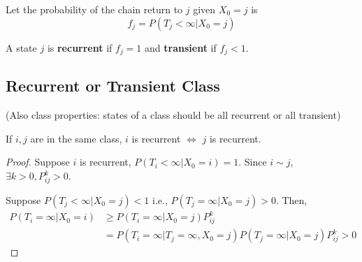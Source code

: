 \documentclass[11pt]{elegantbook}
\begin{document}
Let the probability of the chain return to $j$ given $X_0=j$ is $$f_j=P(T_j<\infty|X_0=j)$$

\begin{definition}
    A state $j$ is \textbf{recurrent} if $f_j=1$ and \textbf{transient} if $f_j<1$.
\end{definition}

\subsection{Recurrent or Transient Class}
(Also class properties: states of a class should be all recurrent or all transient)
\begin{lemma}
    If $i,j$ are in the same class, $i$ is recurrent $\Leftrightarrow$ $j$ is recurrent.
\end{lemma}
\begin{proof}
    Suppose $i$ is recurrent, $P(T_i<\infty|X_0=i)=1$. Since $i\sim j$, $\exists k>0,P_{ij}^k>0$.

    Suppose $P(T_j<\infty|X_0=j)<1$ i.e., $P(T_j=\infty|X_0=j)>0$. Then,
    \begin{equation}
        \begin{aligned}
            P(T_i=\infty|X_0=i)&\geq P(T_i=\infty|X_0=j)P_{ij}^k\\
            &=P(T_i=\infty| T_j=\infty, X_0=j)P(T_j=\infty| X_0=j)P_{ij}^k>0
        \end{aligned}
        \nonumber
    \end{equation}
\end{proof}
\end{document}
